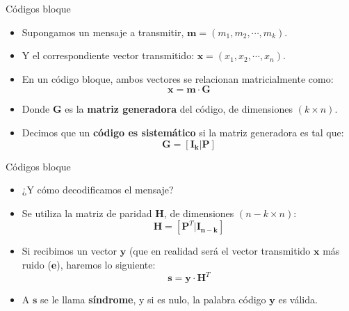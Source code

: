 \documentclass[10pt,compress]{beamer} %
\begin{document}
\begin{frame}{Códigos bloque}
  \begin{itemize}
    \item Supongamos un mensaje a transmitir, $\mathbf{m} = (m_1, m_2, \cdots, m_k)$.
    \item Y el correspondiente vector transmitido: $\mathbf{x} = (x_1, x_2, \cdots, x_n)$.
    \item En un código bloque, ambos vectores se relacionan matricialmente como:
    \begin{displaymath}
      \mathbf{x} = \mathbf{m} \cdot \mathbf{G}
    \end{displaymath}
    \item Donde $\mathbf{G}$ es la {\bf matriz generadora} del código, de dimensiones $(k \times n)$.
    \item Decimos que un {\bf código es sistemático} si la matriz generadora es tal que:
    \begin{displaymath}
      \mathbf{G} = [ \mathbf{I_k} | \mathbf{P} ]
    \end{displaymath}
  \end{itemize}
\end{frame}

\begin{frame}{Códigos bloque}
  \begin{itemize}
    \item ¿Y cómo decodificamos el mensaje?
    \item Se utiliza la matriz de paridad $\mathbf{H}$, de dimensiones $(n-k \times n)$:
    \begin{displaymath}
      \mathbf{H} = [ \mathbf{P}^T | \mathbf{I_{n-k}}]
    \end{displaymath}
    \item Si recibimos un vector $\mathbf{y}$ (que en realidad será el vector transmitido $\mathbf{x}$ más ruido ($\mathbf{e}$), haremos lo siguiente:
    \begin{displaymath}
      \mathbf{s} = \mathbf{y} \cdot \mathbf{H}^T
    \end{displaymath}
    \item A $\mathbf{s}$ se le llama {\bf síndrome}, y si es nulo, la palabra código $\mathbf{y}$ es válida.
  \end{itemize}
\end{frame}
\end{document}
